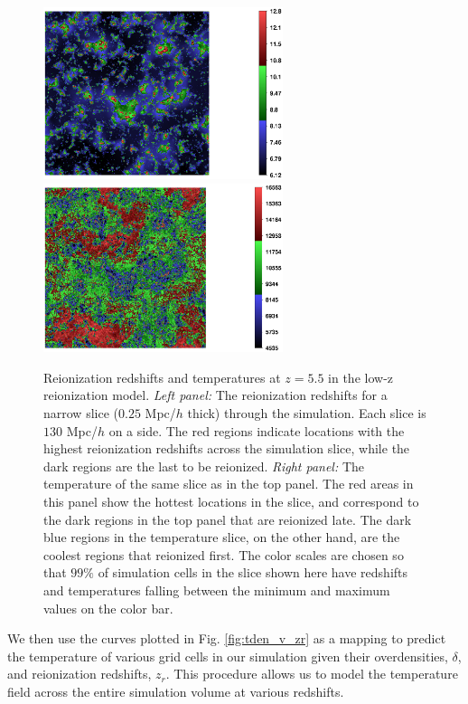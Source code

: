 \begin{figure}[t]
\bc
\includegraphics[width=7cm]{f3a.ps}
\includegraphics[width=7cm]{f3b.ps}
\caption{Reionization redshifts and temperatures at $z=5.5$ in the low-z reionization model.
{\em Left panel:} The reionization redshifts for a narrow slice ($0.25$ Mpc/$h$ thick) through
the simulation. Each slice is $130$ Mpc/$h$ on a side. The red regions indicate locations with the highest reionization redshifts across
the simulation slice, while the dark regions are the last to be reionized. {\em Right panel:}
The temperature of the same slice as in the top panel. The red areas in this panel show the
hottest locations in the slice, and correspond to the dark regions in the top panel that
are reionized late. The dark blue regions in the temperature slice, on the other hand, are the coolest regions that reionized
first. The color scales are chosen so that $99\%$ of simulation cells in the slice shown here have redshifts and temperatures falling 
between the minimum and maximum values on the color bar.}
\label{fig:tslice_lowz}
\ec
\end{figure}

We then use the curves plotted in Fig. \ref{fig:tden_v_zr} as a mapping to predict the temperature of various grid cells in our
simulation given their overdensities, $\delta$, and reionization redshifts, $z_r$. This procedure allows us to model the temperature
field across the entire simulation volume at various redshifts. 


